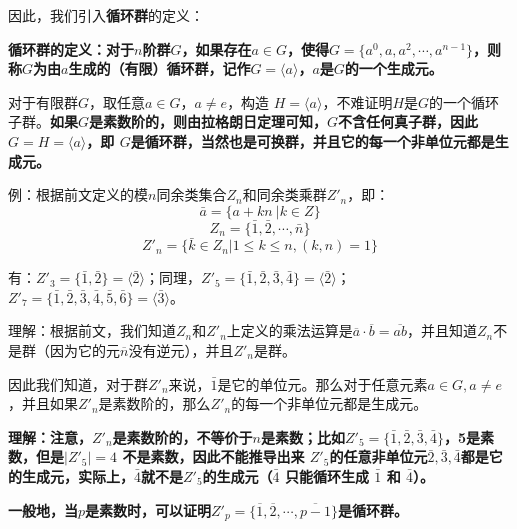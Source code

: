 \documentclass[12pt]{article}
\begin{document}
因此，我们引入\textbf{循环群}的定义：
\begin{mdframed}[
linecolor=black!40,outerlinewidth=1pt,roundcorner=.5em,innertopmargin=1ex,innerbottommargin=.5\baselineskip,innerrightmargin=1em,innerleftmargin=1em,backgroundcolor=gray!5,
]
\textbf{
循环群的定义：对于$n$阶群$G$，如果存在$a \in G$，使得$G = \{a^0, a, a^2, \cdots, a^{n-1}\}$，则称$G$为由$a$生成的（有限）循环群，记作$G = \langle a \rangle$，$a$是$G$的一个生成元。
}
\end{mdframed}

对于有限群$G$，取任意$a \in G$，$a \neq e$，构造 $H = \langle a \rangle$，不难证明$H$是$G$的一个循环子群。\textbf{如果$G$是素数阶的，则由拉格朗日定理可知，$G$不含任何真子群，因此$G = H = \langle a \rangle$，即
$G$是循环群，当然也是可换群，并且它的每一个非单位元都是生成元。}

\begin{framed}
例：根据前文定义的模$n$同余类集合$Z_n$和同余类乘群$Z'_n$，即：
$$
\bar{a} = \{a + kn\ | k \in Z\}
$$
$$
Z_n = \{\bar{1}, \bar{2}, \cdots, \bar{n}\}
$$
$$
Z'_n = \{\bar{k} \in Z_n | 1 \le k \le n, (k,n) = 1\}
$$

有：$Z'_3 = \{\bar{1}, \bar{2}\} = \langle\bar{2}\rangle $；同理，$Z'_5 = \{\bar{1}, \bar{2}, \bar{3}, \bar{4}\} = \langle\bar{2}\rangle$；$Z'_7 = \{\bar{1}, \bar{2}, \bar{3}, \bar{4}, \bar{5}, \bar{6}\} = \langle\bar{3}\rangle$。

理解：根据前文，我们知道$Z_n$和$Z'_n$上定义的乘法运算是$\overline{a}\cdot \overline{b} = \overline{ab}$，并且知道$Z_n$不是群（因为它的元$\overline{n}$没有逆元），并且$Z'_n$是群。

因此我们知道，对于群$Z'_n$来说，$\bar{1}$是它的单位元。那么对于任意元素$a \in G, a \neq e$，并且如果$Z'_n$是素数阶的，那么$Z'_n$的每一个非单位元都是生成元。

\textbf{
理解：注意，$Z'_n$是素数阶的，不等价于$n$是素数；比如$Z'_5 = \{\bar{1}, \bar{2}, \bar{3}, \bar{4}\} $，5是素数，但是$|Z'_5| = 4$ 不是素数，因此不能推导出来 $Z'_5$的任意非单位元$\bar{2}, \bar{3}, \bar{4}$都是它的生成元，实际上，$\bar{4}$就不是$Z'_5$的生成元（$\bar{4}$ 只能循环生成 $\bar{1}$ 和 $\bar{4}$）。
}
\end{framed}

\begin{mdframed}[
linecolor=black!40,outerlinewidth=1pt,roundcorner=.5em,innertopmargin=1ex,innerbottommargin=.5\baselineskip,innerrightmargin=1em,innerleftmargin=1em,backgroundcolor=gray!5,
]
\textbf{
一般地，当$p$是素数时，可以证明$Z'_p = \{\overline{1}, \overline{2}, \cdots, \overline{p-1}\}$是循环群。  
}
\end{mdframed}
\end{document}
